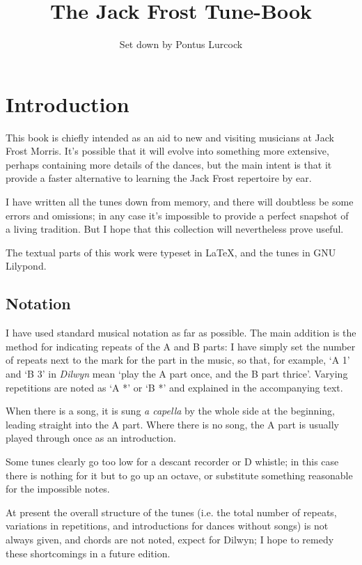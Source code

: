 \documentclass[12pt,a4paper]{article}
\title{The Jack Frost Tune-Book}
\author{\small Set down by Pontus Lurcock}
\begin{document}
\maketitle
\samepage

\section*{Introduction}

This book is chiefly intended as an aid to new and visiting musicians
at Jack Frost Morris. It's possible that it will evolve into something
more extensive, perhaps containing more details of the dances, but the
main intent is that it provide a faster alternative to learning the
Jack Frost repertoire by ear.

I have written all the tunes down from memory, and there will
doubtless be some errors and omissions; in any case it's impossible to
provide a perfect snapshot of a living tradition. But I hope that this
collection will nevertheless prove useful.

The textual parts of this work were typeset in \LaTeX{}, and the tunes
in GNU Lilypond.

\subsection*{Notation}

I have used standard musical notation as far as possible. The main
addition is the method for indicating repeats of the A and B parts: I
have simply set the number of repeats next to the mark for the part in
the music, so that, for example, `A 1' and `B 3' in {\it Dilwyn} mean
`play the A part once, and the B part thrice'. Varying repetitions are
noted as `A *' or `B *' and explained in the accompanying text.

When there is a song, it is sung {\it a capella} by the whole side at
the beginning, leading straight into the A part. Where there is no
song, the A part is usually played through once as an introduction.

Some tunes clearly go too low for a descant recorder or D whistle; in
this case there is nothing for it but to go up an octave, or
substitute something reasonable for the impossible notes.

At present the overall structure of the tunes (i.e. the total number
of repeats, variations in repetitions, and introductions for dances
without songs) is not always given, and chords are not noted, expect
for Dilwyn; I hope to remedy these shortcomings in a future edition.
\end{document}
